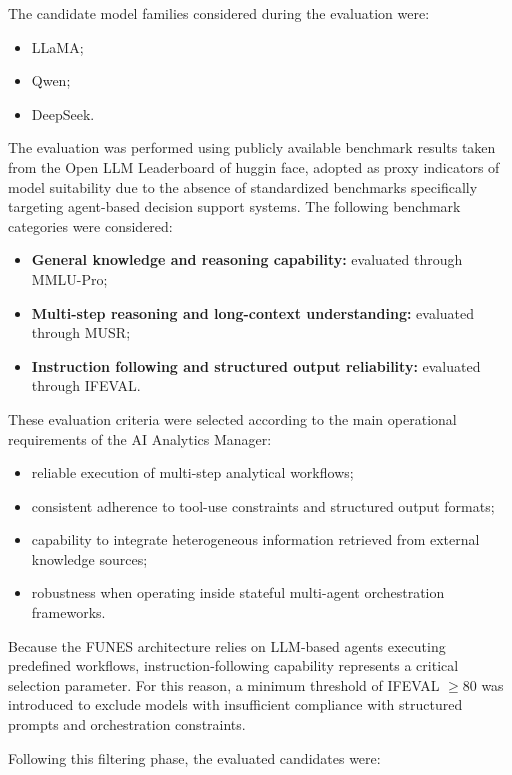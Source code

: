 The candidate model families considered during the evaluation were:

\begin{itemize}
    \item LLaMA;
    \item Qwen;
    \item DeepSeek.
\end{itemize}

The evaluation was performed using publicly available benchmark results taken from the Open LLM Leaderboard of huggin face, adopted as proxy indicators of model suitability due to the absence of standardized benchmarks specifically targeting agent-based decision support systems. The following benchmark categories were considered:

\begin{itemize}
    \item \textbf{General knowledge and reasoning capability:} evaluated through MMLU-Pro;
    \item \textbf{Multi-step reasoning and long-context understanding:} evaluated through MUSR;
    \item \textbf{Instruction following and structured output reliability:} evaluated through IFEVAL.
\end{itemize}

These evaluation criteria were selected according to the main operational requirements of the AI Analytics Manager:

\begin{itemize}
    \item reliable execution of multi-step analytical workflows;
    \item consistent adherence to tool-use constraints and structured output formats;
    \item capability to integrate heterogeneous information retrieved from external knowledge sources;
    \item robustness when operating inside stateful multi-agent orchestration frameworks.
\end{itemize}

Because the FUNES architecture relies on LLM-based agents executing predefined workflows, instruction-following capability represents a critical selection parameter. For this reason, a minimum threshold of IFEVAL $\geq 80$ was introduced to exclude models with insufficient compliance with structured prompts and orchestration constraints.

Following this filtering phase, the evaluated candidates were:

